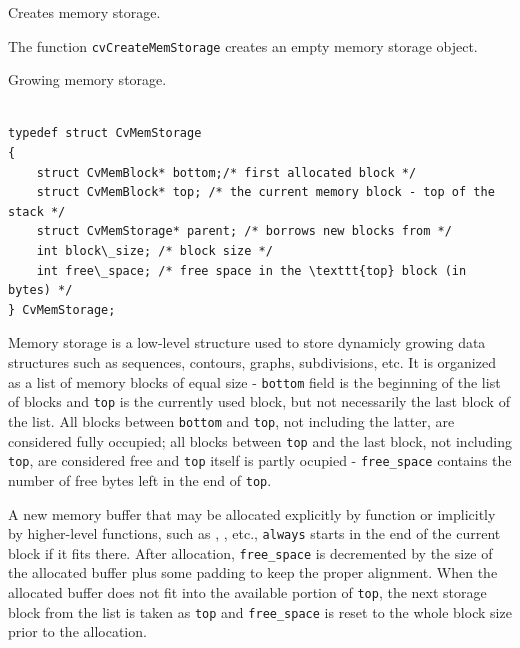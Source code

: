\ifPython
{}\label{CreateMemStorage}

Creates memory storage.


\begin{description}
\end{description}

The function \texttt{cvCreateMemStorage} creates an empty memory storage object.

\fi

\ifC
{}\label{CvMemStorage}

Growing memory storage.

\begin{lstlisting}

typedef struct CvMemStorage
{
    struct CvMemBlock* bottom;/* first allocated block */
    struct CvMemBlock* top; /* the current memory block - top of the stack */
    struct CvMemStorage* parent; /* borrows new blocks from */
    int block\_size; /* block size */
    int free\_space; /* free space in the \texttt{top} block (in bytes) */
} CvMemStorage;

\end{lstlisting}

Memory storage is a low-level structure used to store dynamicly growing
data structures such as sequences, contours, graphs, subdivisions, etc. It
is organized as a list of memory blocks of equal size - \texttt{bottom}
field is the beginning of the list of blocks and \texttt{top} is the
currently used block, but not necessarily the last block of the list. All
blocks between \texttt{bottom} and \texttt{top}, not including the
latter, are considered fully occupied; all blocks between \texttt{top}
and the last block, not including \texttt{top}, are considered free
and \texttt{top} itself is partly ocupied - \texttt{free\_space}
contains the number of free bytes left in the end of \texttt{top}.

A new memory buffer that may be allocated explicitly by
 function or implicitly by higher-level functions,
such as , , etc., \texttt{always}
starts in the end of the current block if it fits there. After allocation,
\texttt{free\_space} is decremented by the size of the allocated buffer
plus some padding to keep the proper alignment. When the allocated buffer
does not fit into the available portion of \texttt{top}, the next storage
block from the list is taken as \texttt{top} and \texttt{free\_space}
is reset to the whole block size prior to the allocation.

